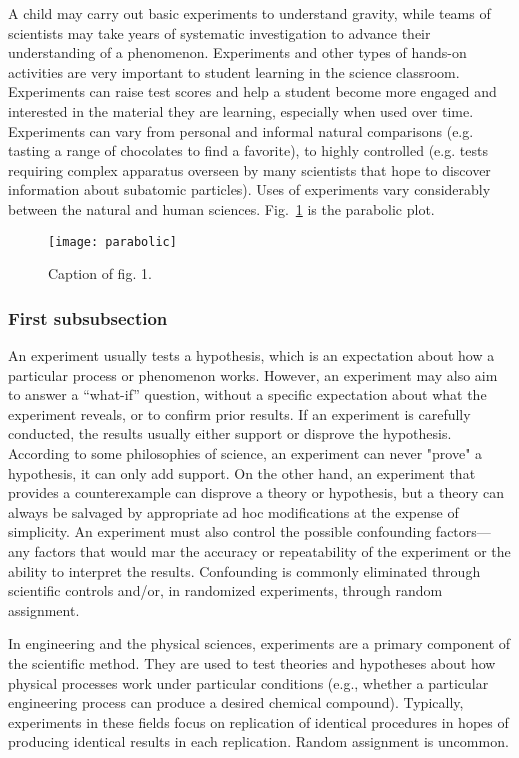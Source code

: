 \documentclass[11pt, a4paper]{article}
\begin{document}
A child may carry out basic experiments to understand gravity, while teams of scientists may take years of systematic investigation to advance their understanding of a phenomenon. Experiments and other types of hands-on activities are very important to student learning in the science classroom. Experiments can raise test scores and help a student become more engaged and interested in the material they are learning, especially when used over time. Experiments can vary from personal and informal natural comparisons (e.g. tasting a range of chocolates to find a favorite), to highly controlled (e.g. tests requiring complex apparatus overseen by many scientists that hope to discover information about subatomic particles). Uses of experiments vary considerably between the natural and human sciences. Fig.~\ref{fig:parabolic} is the parabolic plot.

\begin{figure}
	\centering
	\texttt{[image: parabolic]}
	\caption{Caption of fig. 1.}
	\label{fig:parabolic}
\end{figure}

\subsubsection{First subsubsection}
An experiment usually tests a hypothesis, which is an expectation about how a particular process or phenomenon works. However, an experiment may also aim to answer a ``what-if'' question, without a specific expectation about what the experiment reveals, or to confirm prior results. If an experiment is carefully conducted, the results usually either support or disprove the hypothesis. According to some philosophies of science, an experiment can never "prove" a hypothesis, it can only add support. On the other hand, an experiment that provides a counterexample can disprove a theory or hypothesis, but a theory can always be salvaged by appropriate ad hoc modifications at the expense of simplicity. An experiment must also control the possible confounding factors—any factors that would mar the accuracy or repeatability of the experiment or the ability to interpret the results. Confounding is commonly eliminated through scientific controls and/or, in randomized experiments, through random assignment.

In engineering and the physical sciences, experiments are a primary component of the scientific method. They are used to test theories and hypotheses about how physical processes work under particular conditions (e.g., whether a particular engineering process can produce a desired chemical compound). Typically, experiments in these fields focus on replication of identical procedures in hopes of producing identical results in each replication. Random assignment is uncommon.
\end{document}
